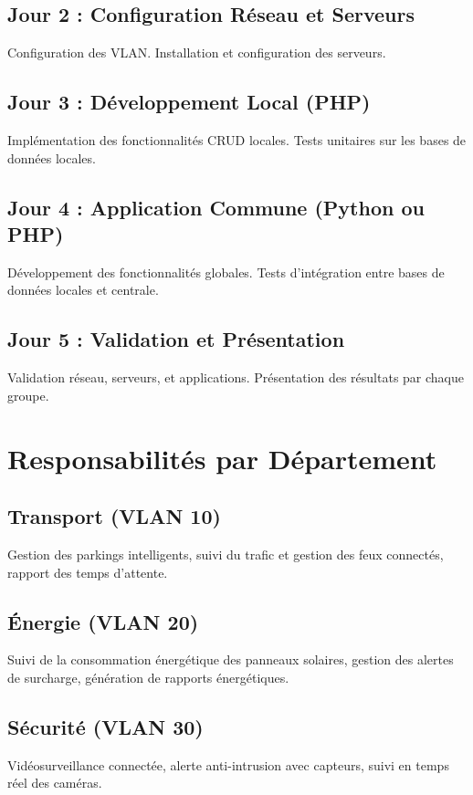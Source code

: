 \documentclass[a4paper,12pt]{report}
\begin{document}
\section{Jour 2 : Configuration Réseau et Serveurs}
Configuration des VLAN. Installation et configuration des serveurs.

\section{Jour 3 : Développement Local (PHP)}
Implémentation des fonctionnalités CRUD locales. Tests unitaires sur les bases de données locales.

\section{Jour 4 : Application Commune (Python ou PHP)}
Développement des fonctionnalités globales. Tests d'intégration entre bases de données locales et centrale.

\section{Jour 5 : Validation et Présentation}
Validation réseau, serveurs, et applications. Présentation des résultats par chaque groupe.

\chapter{Responsabilités par Département}
\section{Transport (VLAN 10)}
Gestion des parkings intelligents, suivi du trafic et gestion des feux connectés, rapport des temps d'attente.

\section{Énergie (VLAN 20)}
Suivi de la consommation énergétique des panneaux solaires, gestion des alertes de surcharge, génération de rapports énergétiques.

\section{Sécurité (VLAN 30)}
Vidéosurveillance connectée, alerte anti-intrusion avec capteurs, suivi en temps réel des caméras.
\end{document}
